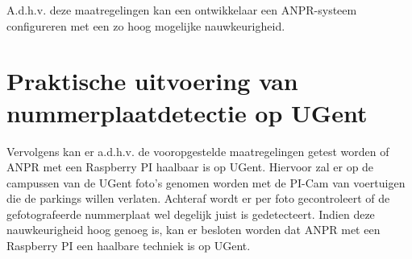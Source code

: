 A.d.h.v. deze maatregelingen kan een ontwikkelaar een ANPR-systeem configureren met een zo hoog mogelijke nauwkeurigheid. 

\section{Praktische uitvoering van nummerplaatdetectie op UGent}
Vervolgens kan er a.d.h.v. de vooropgestelde maatregelingen getest worden of ANPR met een Raspberry PI haalbaar is op UGent. Hiervoor zal er op de campussen van de UGent foto's genomen worden met de PI-Cam van voertuigen die de parkings willen verlaten. Achteraf wordt er per foto gecontroleert of de gefotografeerde nummerplaat wel degelijk juist is gedetecteert. Indien deze nauwkeurigheid hoog genoeg is, kan er besloten worden dat ANPR met een Raspberry PI een haalbare techniek is op UGent.